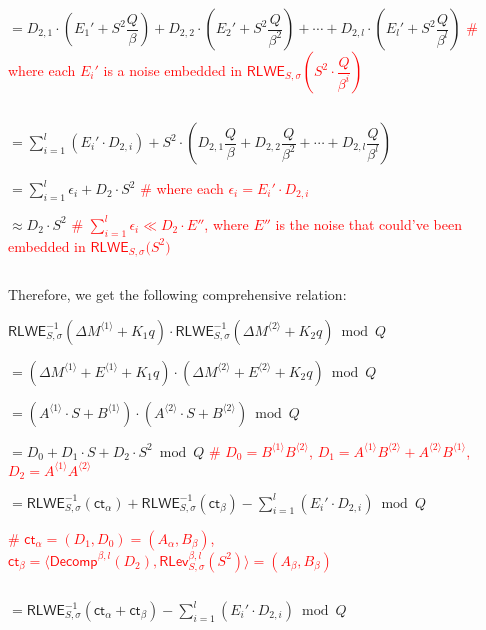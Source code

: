 $= D_{2,1}\cdot\left(E_1' +  S^2\dfrac{Q}{\beta}\right) + D_{2,2}\cdot\left(E_2' +  S^2\dfrac{Q}{\beta^2}\right) + \cdots + D_{2,l}\cdot\left(E_l' +  S^2\dfrac{Q}{\beta^l}\right)$ \textcolor{red}{ \text{ } \# where each $E_i'$ is a noise embedded in $\textsf{RLWE}_{S, \sigma}\left(S^2\cdot\dfrac{Q}{\beta^i}\right)$}

$ $

$= \sum\limits_{i=1}^{l} (E_i'\cdot D_{2,i}) +  S^2\cdot\left(D_{2,1}\dfrac{Q}{\beta} + D_{2,2}\dfrac{Q}{\beta^2} + \cdots + D_{2, l}\dfrac{Q}{\beta^l}\right)$

$= \sum\limits_{i=1}^{l} \epsilon_{i} + D_2\cdot S^2$ \textcolor{red}{ \text{ } \# where each $\epsilon_i = E_i'\cdot D_{2,i}$}

$\approx D_2\cdot S^2$ \textcolor{red}{ \text{ } \# $\sum\limits_{i=1}^{l} \epsilon_{i} \ll D_2\cdot E''$, where $E''$ is the noise that could've been embedded in $\textsf{RLWE}_{S, \sigma}\bm(S^2\bm)$}

$ $

Therefore, we get the following comprehensive relation:


$\textsf{RLWE}_{S, \sigma}^{-1}(\Delta M^{\langle 1 \rangle} + K_1q) \cdot \textsf{RLWE}_{S, \sigma}^{-1}(\Delta M^{\langle 2 \rangle} + K_2q) \bmod Q$

$= (\Delta M^{\langle 1 \rangle} + E^{\langle 1 \rangle} + K_1q) \cdot (\Delta M^{\langle 2 \rangle} + E^{\langle 2 \rangle} + K_2q) \bmod Q$

$ = (A^{\langle 1 \rangle} \cdot S + B^{\langle 1 \rangle}) \cdot (A^{\langle 2 \rangle} \cdot S + B^{\langle 2 \rangle})  \bmod Q$

$ = D_0 + D_1\cdot S + D_2\cdot S^2  \bmod Q$ \textcolor{red}{ \# $D_0 = B^{\langle 1 \rangle} B^{\langle 2 \rangle}$, \text{ } $D_1 = A^{\langle 1 \rangle} B^{\langle 2 \rangle} + A^{\langle 2 \rangle} B^{\langle 1 \rangle}$, \text{ } $D_2 = A^{\langle 1 \rangle} A^{\langle 2 \rangle}$}

$ = \textsf{RLWE}_{S, \sigma}^{-1}(\textsf{ct}_\alpha) + \textsf{RLWE}_{S, \sigma}^{-1}(\textsf{ct}_\beta) - \sum\limits_{i=1}^{l} (E_i'\cdot D_{2,i})  \bmod Q$ 

\textcolor{red}{ \# $\textsf{ct}_\alpha = (D_1, D_0) = (A_\alpha, B_\beta)$, \text{ } $\textsf{ct}_\beta = \langle \textsf{Decomp}^{\beta, l}(D_2), \textsf{RLev}_{S, \sigma}^{\beta, l}(S^2) \rangle = (A_\beta, B_\beta)$}

$ $

$ = \textsf{RLWE}_{S, \sigma}^{-1}(\textsf{ct}_\alpha + \textsf{ct}_\beta) - \sum\limits_{i=1}^{l} (E_i'\cdot D_{2,i})  \bmod Q$

